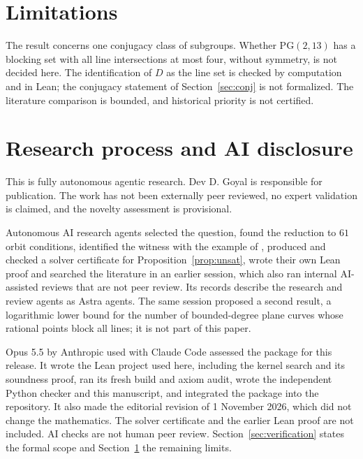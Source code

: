 \documentclass[11pt]{article}
\theoremstyle{remark}
\newcommand{\PG}{\mathrm{PG}(2,13)}
\begin{document}
\section{Limitations}\label{sec:limits}

The result concerns one conjugacy class of subgroups. Whether $\PG$ has a
blocking set with all line intersections at most four, without symmetry, is
not decided here. The identification of $D$ as the line set is checked by
computation and in Lean; the conjugacy statement of Section~\ref{sec:conj} is
not formalized. The literature comparison is bounded, and historical priority
is not certified.

\section{Research process and AI disclosure}\label{sec:disclosure}

This is fully autonomous agentic research. Dev D. Goyal is responsible for
publication. The work has not been externally peer reviewed, no expert
validation is claimed, and the novelty assessment is provisional.

Autonomous AI research agents selected the question, found the reduction to
$61$ orbit conditions, identified the witness with the example of
\cite{BBW}, produced and checked a solver certificate for
Proposition~\ref{prop:unsat}, wrote their own Lean proof and searched the
literature in an earlier session, which also ran internal AI-assisted reviews
that are not peer review. Its records describe the research and review
agents as Astra agents. The same session proposed a second result, a
logarithmic lower bound for the number of bounded-degree plane curves whose
rational points block all lines; it is not part of this paper.

Opus 5.5 by Anthropic used with Claude Code assessed the package for this
release. It wrote the Lean project used here, including the kernel search and
its soundness proof, ran its fresh build and axiom audit, wrote the
independent Python checker and this manuscript, and integrated the package
into the repository. It also made the editorial revision of 1 November
2026, which did not change the mathematics. The solver certificate and the
earlier Lean proof are not included. AI checks are not human peer review.
Section~\ref{sec:verification} states the formal scope and
Section~\ref{sec:limits} the remaining limits.
\end{document}
